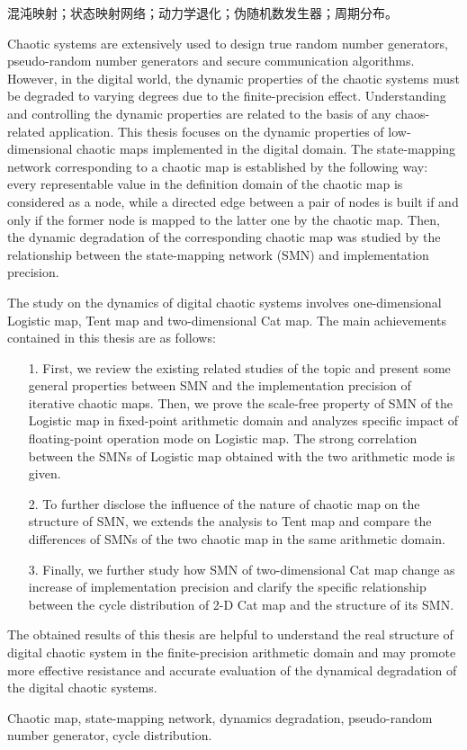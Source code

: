 \begin{cnkeywords}
混沌映射；状态映射网络；动力学退化；伪随机数发生器；周期分布。
\end{cnkeywords}
\newpage
\begin{enabstract}

Chaotic systems are extensively used to design true random number generators, pseudo-random number generators and secure communication algorithms. However, in the digital world, the dynamic properties of the chaotic systems must be degraded to varying degrees due to the finite-precision effect. Understanding and controlling the dynamic properties are related to the basis of any chaos-related application. This thesis focuses on the dynamic properties of low-dimensional chaotic maps implemented in the digital domain. The state-mapping network corresponding to a chaotic map is established by the following way: every representable value in the definition domain of the chaotic map is
considered as a node, while a directed edge between a pair of nodes is built if and only if the former node is
mapped to the latter one by the chaotic map. Then, the dynamic degradation of the corresponding chaotic map was studied
by the relationship between the state-mapping network (SMN) and implementation precision.

The study on the dynamics of digital chaotic systems involves one-dimensional Logistic map, Tent map
and two-dimensional Cat map. The main achievements contained in this thesis are as follows:
\begin{itemize}
\item[1.]
First, we review the existing related studies of the topic and present some general properties between SMN and
the implementation precision of iterative chaotic maps. Then, we prove the scale-free property of SMN of the Logistic map
in fixed-point arithmetic domain and analyzes specific impact of floating-point operation mode on Logistic map.
The strong correlation between the SMNs of Logistic map obtained with the two arithmetic mode is given.
\item[2.]
To further disclose the influence of the nature of chaotic map on the structure of SMN, we extends the analysis to Tent map
and compare the differences of SMNs of the two chaotic map in the same arithmetic domain.
\item[3.]
Finally, we further study how SMN of two-dimensional Cat map change as increase of implementation precision and clarify
the specific relationship between the cycle distribution of 2-D Cat map and the structure of its SMN.
\end{itemize}

The obtained results of this thesis are helpful to understand the real structure of digital chaotic system in the finite-precision arithmetic domain and may promote more effective resistance and accurate evaluation of the dynamical degradation of the digital chaotic systems.

\end{enabstract}

\begin{enkeywords}
Chaotic map, state-mapping network, dynamics degradation, pseudo-random number generator, cycle distribution.
\end{enkeywords} 